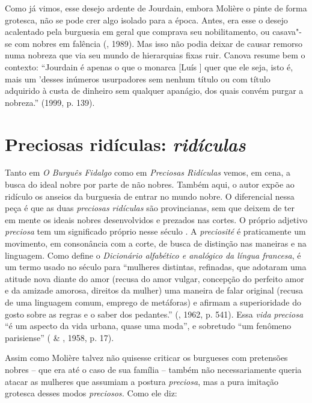 Como já vimos, esse desejo ardente de Jourdain, embora Molière o pinte
de forma grotesca, não se pode crer algo isolado para a época. Antes,
era esse o desejo acalentado pela burguesia em geral que comprava seu
nobilitamento, ou casava"-se com nobres em falência (, 1989).
Mas isso não podia deixar de causar remorso numa nobreza que via seu
mundo de hierarquias fixas ruir. Canova resume bem o contexto:
``Jourdain é apenas o que o monarca [Luís ] quer que ele seja,
isto é, mais um 'desses inúmeros usurpadores sem nenhum título ou com
título adquirido à custa de dinheiro sem qualquer apanágio, dos quais
convém purgar a nobreza.'' (1999, p. 139).

\section{Preciosas ridículas: \emph{ridículas}}

Tanto em \emph{O Burguês Fidalgo} como em \emph{Preciosas Ridículas}
vemos, em cena, a busca do ideal nobre por parte de não nobres. Também
aqui, o autor expõe ao ridículo os anseios da burguesia de entrar no
mundo nobre. O diferencial nessa peça é que as duas \emph{preciosas}
\emph{ridículas} são provincianas, sem que deixem de ter em mente os
ideais nobres desenvolvidos e prezados nas cortes. O próprio adjetivo
\emph{preciosa} tem um significado próprio nesse século . A
\emph{preciosité} é praticamente um movimento, em consonância com a
corte, de busca de distinção nas maneiras e na linguagem. Como define o
\emph{Dicionário alfabético e analógico da língua francesa}, é um termo
usado no século  para ``mulheres distintas, refinadas, que adotaram
uma atitude nova diante do amor (recusa do amor vulgar, concepção do
perfeito amor e da amizade amorosa, direitos da mulher) uma maneira de
falar original (recusa de uma linguagem comum, emprego de metáforas) e
afirmam a superioridade do gosto sobre as regras e o saber dos
pedantes.'' (, 1962, p. 541). Essa \emph{vida} \emph{preciosa} ``é
um aspecto da vida urbana, quase uma moda'', e sobretudo ``um fenômeno
parisiense'' ( \& , 1958, p. 17).

Assim como Molière talvez não quisesse criticar os burgueses com
pretensões nobres -- que era até o caso de sua família -- também não
necessariamente queria atacar as mulheres que assumiam a postura
\emph{preciosa}, mas a pura imitação grotesca desses modos
\emph{preciosos.} Como ele diz:

